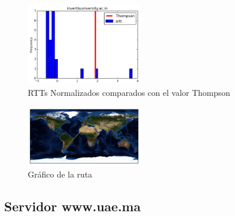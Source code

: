 \begin{figure}[H]
  \centering
    \includegraphics[width=0.45\textwidth]{histogramas_thompson/invertisuniversity-ac-in.png}
  \caption{RTTs Normalizados comparados con el valor Thompson}
  \label{entropia-s}
\end{figure}

\begin{figure}[H]
  \centering
    \includegraphics[width=0.45\textwidth]{grafico-rutas/invertisuniversity-ac-in.png}
  \caption{Gráfico de la ruta}
  \label{entropia-s}
\end{figure}




\subsection{Servidor www.uae.ma}

